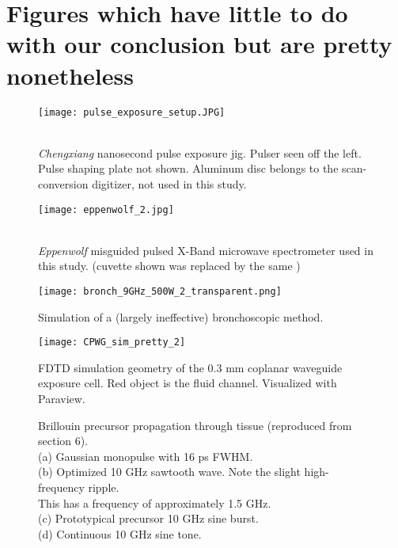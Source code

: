\documentclass[fleqn,10pt]{article}
\begin{document}



\tableofcontents



\section{Figures which have little to do with our conclusion but are pretty nonetheless}

\begin{figure}[H]
	\captionsetup{singlelinecheck = false, justification=justified}
	\centering
	\texttt{[image: pulse\_exposure\_setup.JPG]}
	\caption{\\ \textit{Chengxiang} nanosecond pulse exposure jig. Pulser seen off the left. Pulse shaping plate not shown. Aluminum disc belongs to the scan-conversion digitizer, not used in this study.}
\end{figure}
	
\begin{figure}[H]
	\captionsetup{singlelinecheck = false, justification=justified}
	\centering
	\texttt{[image: eppenwolf\_2.jpg]}
	\caption{\\ \textit{Eppenwolf} misguided pulsed X-Band microwave spectrometer used in this study. (cuvette shown was replaced by the same )}
\end{figure}

\begin{figure}[H]
	\captionsetup{singlelinecheck = false, justification=justified}
	\centering
	\texttt{[image: bronch\_9GHz\_500W\_2\_transparent.png]}
	\caption{Simulation of a (largely ineffective) bronchoscopic method.}
\end{figure}


\begin{figure}[H]
	\captionsetup{singlelinecheck = false, justification=justified}
	\centering
	\texttt{[image: CPWG\_sim\_pretty\_2]}
	\caption{FDTD simulation geometry of the 0.3 mm coplanar waveguide exposure cell. Red object is the fluid channel. Visualized with Paraview.
		}
\end{figure}

\begin{figure}[H]
	
	\caption{Brillouin precursor propagation through tissue (reproduced from section 6).\\
	(a) Gaussian monopulse with 16 ps FWHM.\\
	(b) Optimized 10 GHz sawtooth wave. Note the slight high-frequency ripple.\\ This has a frequency of approximately 1.5 GHz.\\
	(c) Prototypical precursor 10 GHz sine burst.\\
	(d) Continuous 10 GHz sine tone.}

\end{figure}
\end{document}
